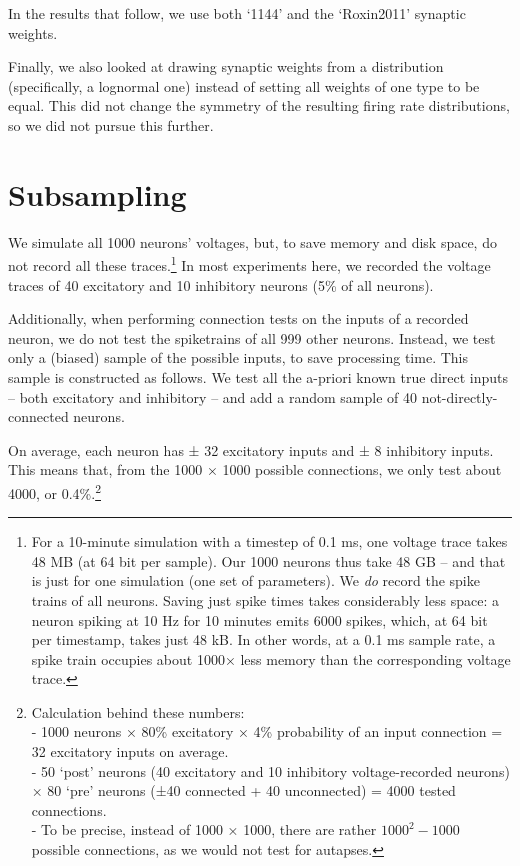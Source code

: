 In the results that follow, we use both `1144' and the `Roxin2011' synaptic weights.

Finally, we also looked at drawing synaptic weights from a distribution (specifically, a lognormal one) instead of setting all weights of one type to be equal. This did not change the symmetry of the resulting firing rate distributions, so we did not pursue this further.


\section{Subsampling}

We simulate all 1000 neurons' voltages, but, to save memory and disk space,  do not record all these traces.\footnote{
    For a 10-minute simulation with a timestep of 0.1 ms, one voltage trace takes 48 MB (at 64 bit per sample). Our 1000 neurons thus take 48 GB -- and that is just for one simulation (one set of parameters).\newline
    We \emph{do} record the spike trains of all neurons. Saving just spike times takes considerably less space: a neuron spiking at 10 Hz for 10 minutes emits 6000 spikes, which, at 64 bit per timestamp, takes just  48 kB.\newline
    In other words,  at a 0.1 ms sample rate, a spike train occupies about 1000× less memory than the corresponding voltage trace.
}
In most experiments here, we recorded the voltage traces of 40 excitatory and 10 inhibitory neurons (5\% of all neurons).

Additionally, when performing connection tests on the inputs of a recorded neuron, we do not test the spiketrains of all 999 other neurons. Instead, we test only a (biased) sample of the possible inputs, to save processing time.
This sample is constructed as follows. We test all the a-priori known true direct inputs -- both excitatory and inhibitory -- and add a random sample of 40 not-directly-connected neurons.

On average, each neuron has ± 32 excitatory inputs and ± 8 inhibitory inputs. This means that, from the 1000 × 1000 possible connections, we only test about 4000, or 0.4\%.\footnote{
    Calculation behind these numbers:\\
    - 1000 neurons × 80\% excitatory × 4\% probability of an input connection = 32 excitatory inputs on average.\\
    - 50 `post' neurons (40 excitatory and 10 inhibitory voltage-recorded neurons) × 80 `pre' neurons (±40 connected + 40 unconnected) = 4000 tested connections.\\
    - To be precise, instead of 1000 × 1000, there are rather  $1000^2 - 1000$ possible connections, as we would not test for autapses.
}

